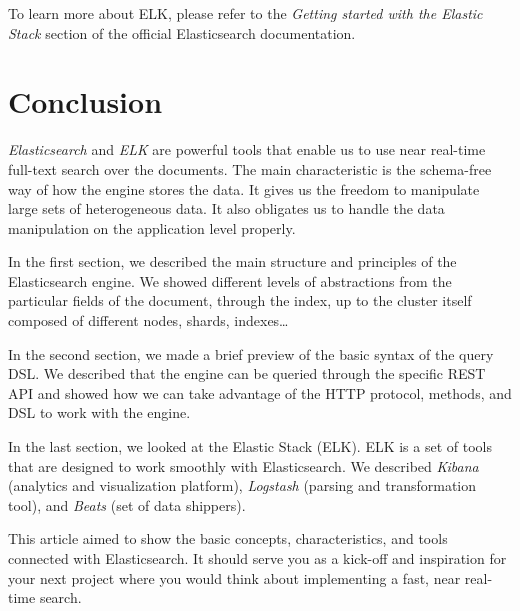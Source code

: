 \documentclass[12pt,a4,twoside]{article}
\begin{document}
To learn more about ELK, please refer to the \textit{Getting started with the Elastic Stack} \cite{elastic_stack} section of the official Elasticsearch documentation.

\newpage

\section*{Conclusion}

\textit{Elasticsearch} and \textit{ELK} are powerful tools that enable us to use near real-time full-text search over the documents. The main characteristic is the schema-free way of how the engine stores the data. It gives us the freedom to manipulate large sets of heterogeneous data. It also obligates us to handle the data manipulation on the application level properly.

In the first section, we described the main structure and principles of the Elasticsearch engine. We showed different levels of abstractions from the particular fields of the document, through the index, up to the cluster itself composed of different nodes, shards, indexes\dots

In the second section, we made a brief preview of the basic syntax of the query DSL. We described that the engine can be queried through the specific REST API and showed how we can take advantage of the HTTP protocol, methods, and DSL to work with the engine.

In the last section, we looked at the Elastic Stack (ELK). ELK is a set of tools that are designed to work smoothly with Elasticsearch. We described \textit{Kibana} (analytics and visualization platform), \textit{Logstash} (parsing and transformation tool), and \textit{Beats} (set of data shippers).

This article aimed to show the basic concepts, characteristics, and tools connected with Elasticsearch. It should serve you as a kick-off and inspiration for your next project where you would think about implementing a fast, near real-time search.

\newpage
\printbibliography
{}
\end{document}
